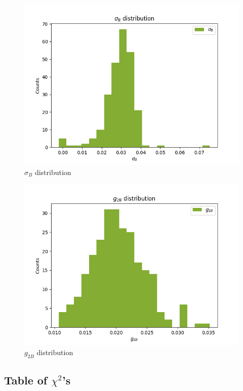 \documentclass[
]{article}
\begin{document}
\begin{figure}
\centering
\includegraphics{pngplots/param7.png}
\caption{\(\sigma_B\) distribution}
\end{figure}

\begin{figure}
\centering
\includegraphics{pngplots/param8.png}
\caption{\(g_{2B}\) distribution}
\end{figure}

\hypertarget{table-of-chi2s}{%
\subsection{\texorpdfstring{Table of
\(\chi^2\)'s}{Table of \textbackslash chi\^{}2's}}\label{table-of-chi2s}}
\end{document}
